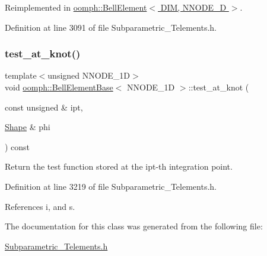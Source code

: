 Reimplemented in \hyperlink{classoomph_1_1BellElement_a99afdb504fee71cb9c557ecb5069cd95}{oomph\+::\+Bell\+Element$<$ D\+I\+M, N\+N\+O\+D\+E\+\_\+D $>$}.



Definition at line 3091 of file Subparametric\+\_\+\+Telements.\+h.

\mbox{\label{classoomph_1_1BellElementBase_aa838429de6549ebb7b9c6d47b17b7859}} 
\subsubsection{\texorpdfstring{test\+\_\+at\+\_\+knot()}{test\_at\_knot()}}
{\footnotesize\ttfamily template$<$unsigned N\+N\+O\+D\+E\+\_\+1D$>$ \\
void \hyperlink{classoomph_1_1BellElementBase}{oomph\+::\+Bell\+Element\+Base}$<$ N\+N\+O\+D\+E\+\_\+1D $>$\+::test\+\_\+at\+\_\+knot (\begin{DoxyParamCaption}\item[{const unsigned \&}]{ipt,  }\item[{\hyperlink{classoomph_1_1Shape}{Shape} \&}]{phi }\end{DoxyParamCaption}) const\hspace{0.3cm}{\ttfamily [inline]}}



Return the test function stored at the ipt-\/th integration point. 



Definition at line 3219 of file Subparametric\+\_\+\+Telements.\+h.



References i, and s.



The documentation for this class was generated from the following file\+:\begin{DoxyCompactItemize}
\item 
\hyperlink{Subparametric__Telements_8h}{Subparametric\+\_\+\+Telements.\+h}\end{DoxyCompactItemize}

